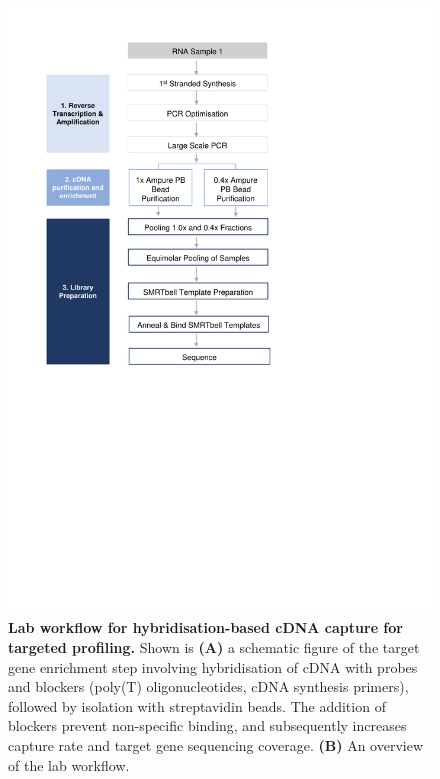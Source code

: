 \begin{figure}[!h]
	\begin{center}
		\includegraphics[page=12,trim={0cm 6cm 0cm 1cm},clip,scale = 0.70]{Figures/ProjectDevelopment_Figures.pdf}
	\end{center}
	\captionsetup{width=0.95\textwidth}
	\caption[Lab workflow for hybridisation-based cDNA capture for targeted profiling]%
	{\textbf{Lab workflow for hybridisation-based cDNA capture for targeted profiling.} Shown is \textbf{(A)} a schematic figure of the target gene enrichment step involving hybridisation of cDNA with probes and blockers (poly(T) oligonucleotides, cDNA synthesis primers), followed by isolation with streptavidin beads. The addition of blockers prevent non-specific binding, and subsequently increases capture rate and target gene sequencing coverage. \textbf{(B)} An overview of the lab workflow.}
	\label{fig:isoseq_targetcapture}
\end{figure}

